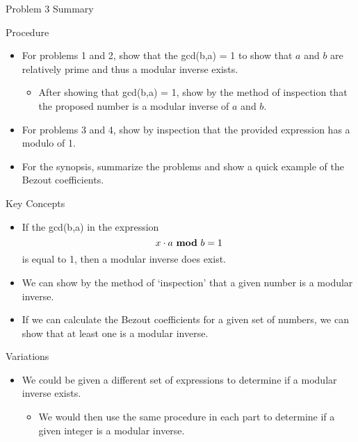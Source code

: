 \begin{summary}{Problem 3 Summary}
    \begin{statement}{Procedure}
        \begin{itemize}
            \item For problems 1 and 2, show that the gcd(b,a) = 1 to show that $a$ and $b$ are relatively prime and thus a modular inverse exists.
            \begin{itemize}
                \item After showing that gcd(b,a) = 1, show by the method of inspection that the proposed number is a modular inverse of $a$ and $b$.
            \end{itemize}
            \item For problems 3 and 4, show by inspection that the provided expression has a modulo of 1.
            \item For the synopsis, summarize the problems and show a quick example of the Bezout coefficients.
        \end{itemize}
    \end{statement}
    \begin{statement}{Key Concepts}
        \begin{itemize}
            \item If the gcd(b,a) in the expression
            \begin{equation*}
                x \cdot a \text{ \textbf{mod} } b = 1
            \end{equation*}
            is equal to 1, then a modular inverse does exist.
            \item We can show by the method of `inspection' that a given number is a modular inverse.
            \item If we can calculate the Bezout coefficients for a given set of numbers, we can show that at least one is a modular inverse.
        \end{itemize}
    \end{statement}
    \begin{statement}{Variations}
        \begin{itemize}
            \item We could be given a different set of expressions to determine if a modular inverse exists.
            \begin{itemize}
                \item We would then use the same procedure in each part to determine if a given integer is a modular inverse.
            \end{itemize}
        \end{itemize}
    \end{statement}
\end{summary}

